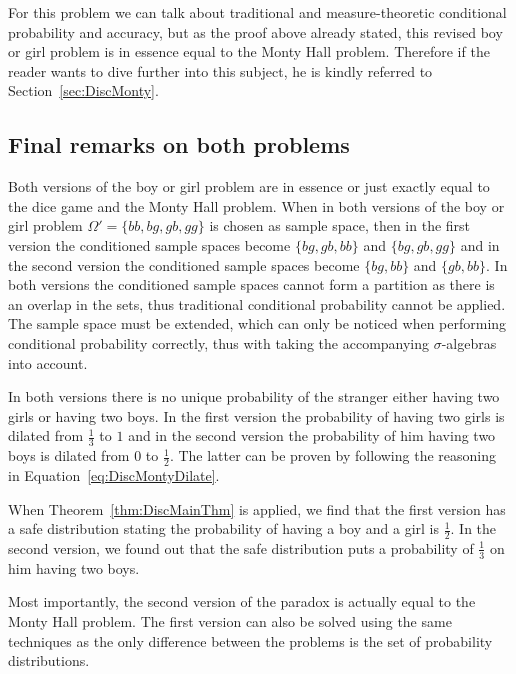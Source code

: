 \documentclass[a4paper]{report}
\theoremstyle{plain}
\theoremstyle{definition}
\theoremstyle{remark}
\numberwithin{equation}{chapter}
\DeclareMathOperator{\1}{\mathbbm{1}}
\begin{document}
For this problem we can talk about traditional and measure-theoretic conditional probability and accuracy, but as the proof above already stated, this revised boy or girl problem is in essence equal to the Monty Hall problem. Therefore if the reader wants to dive further into this subject, he is kindly referred to Section~\ref{sec:DiscMonty}.

\subsection{Final remarks on both problems}
Both versions of the boy or girl problem are in essence or just exactly equal to the dice game and the Monty Hall problem. When in both versions of the boy or girl problem $\Omega'=\{bb,bg,gb,gg\}$ is chosen as sample space, then in the first version the conditioned sample spaces become $\{bg, gb, bb\}$ and $\{bg, gb, gg\}$ and in the second version the conditioned sample spaces become $\{bg, bb\}$ and $\{gb, bb\}$. In both versions the conditioned sample spaces cannot form a partition as there is an overlap in the sets, thus traditional conditional probability cannot be applied. The sample space must be extended, which can only be noticed when performing conditional probability correctly, thus with taking the accompanying $\sigma$-algebras into account.

In both versions there is no unique probability of the stranger either having two girls or having two boys. In the first version the probability of having two girls is dilated from $\frac{1}{3}$ to $1$ and in the second version the probability of him having two boys is dilated from $0$ to $\frac{1}{2}$. The latter can be proven by following the reasoning in Equation~\ref{eq:DiscMontyDilate}.

When Theorem~\ref{thm:DiscMainThm} is applied, we find that the first version has a safe distribution stating the probability of having a boy and a girl is $\frac{1}{2}$. In the second version, we found out that the safe distribution puts a probability of $\frac{1}{3}$ on him having two boys.

Most importantly, the second version of the paradox is actually equal to the Monty Hall problem. The first version can also be solved using the same techniques as the only difference between the problems is the set of probability distributions.
\end{document}
